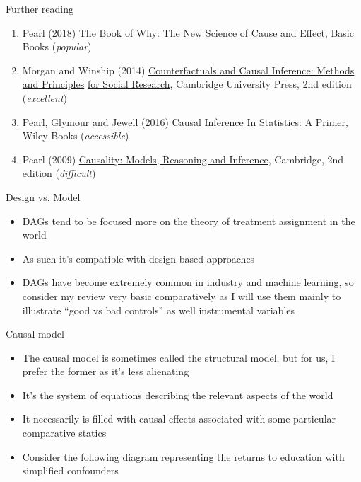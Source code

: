 \documentclass{beamer}
\begin{document}
\begin{frame}{Further reading}

  \begin{enumerate}

    \item Pearl (2018) \underline{The Book of Why: The} \underline{New Science of Cause and Effect}, Basic Books (\emph{popular})
    \item Morgan and Winship (2014) \underline{Counterfactuals and Causal Inference: Methods and Principles} \underline{for Social Research}, Cambridge University Press, 2nd edition (\emph{excellent})
    \item Pearl, Glymour and Jewell (2016) \underline{Causal Inference In Statistics: A Primer}, Wiley Books (\emph{accessible})
    \item Pearl (2009) \underline{Causality: Models, Reasoning and Inference}, Cambridge, 2nd edition (\emph{difficult})
  \end{enumerate}

\end{frame}

\begin{frame}{Design vs. Model}

  \begin{itemize}
    \item DAGs tend to be focused more on the theory of treatment assignment in the world
    \item As such it's compatible with design-based approaches
    \item DAGs have become extremely common in industry and machine learning, so consider my review very basic comparatively as I will use them mainly to illustrate ``good vs bad controls'' as well instrumental variables
  \end{itemize}

\end{frame}



\begin{frame}{Causal model}

  \begin{itemize}
    \item The causal model is sometimes called the structural model, but for us, I prefer the former as it's less alienating
    \item It's the system of equations describing the relevant aspects of the world
    \item It necessarily is filled with causal effects associated with some particular comparative statics
    \item Consider the following diagram representing the returns to education with simplified confounders
  \end{itemize}

\end{frame}
\end{document}

